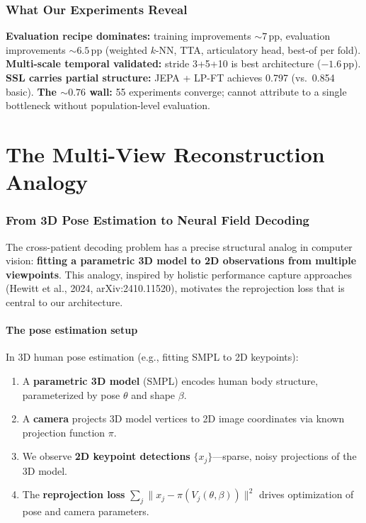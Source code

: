 \documentclass[11pt,letterpaper]{article}
\newcommand{\pp}{\,\text{pp}}
\begin{document}
\section{What Our Experiments Reveal}

\textbf{Evaluation recipe dominates:} training improvements ${\sim}7\pp$, evaluation improvements ${\sim}6.5\pp$ (weighted $k$-NN, TTA, articulatory head, best-of per fold). \textbf{Multi-scale temporal validated:} stride 3+5+10 is best architecture ($-1.6\pp$). \textbf{SSL carries partial structure:} JEPA + LP-FT achieves 0.797 (vs.\ 0.854 basic). \textbf{The ${\sim}0.76$ wall:} 55 experiments converge; cannot attribute to a single bottleneck without population-level evaluation.



\part{The Multi-View Reconstruction Analogy}

\section{From 3D Pose Estimation to Neural Field Decoding}\label{sec:analogy}

The cross-patient decoding problem has a precise structural analog in computer vision: \textbf{fitting a parametric 3D model to 2D observations from multiple viewpoints}. This analogy, inspired by holistic performance capture approaches (Hewitt et al., 2024, arXiv:2410.11520), motivates the reprojection loss that is central to our architecture.

\subsection{The pose estimation setup}

In 3D human pose estimation (e.g., fitting SMPL to 2D keypoints):
\begin{enumerate}[leftmargin=2em]
\item A \textbf{parametric 3D model} (SMPL) encodes human body structure, parameterized by pose $\theta$ and shape $\beta$.
\item A \textbf{camera} projects 3D model vertices to 2D image coordinates via known projection function $\pi$.
\item We observe \textbf{2D keypoint detections} $\{x_j\}$---sparse, noisy projections of the 3D model.
\item The \textbf{reprojection loss} $\sum_j \|x_j - \pi(V_j(\theta, \beta))\|^2$ drives optimization of pose and camera parameters.
\end{enumerate}
\end{document}
